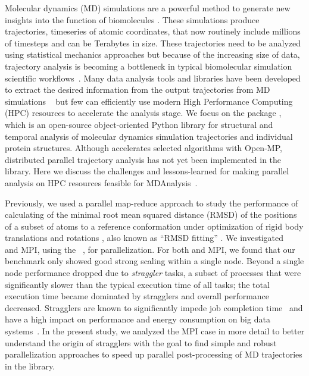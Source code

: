 \label{sec:introduction}
Molecular dynamics (MD) simulations are a powerful method to generate new insights into the function of biomolecules \citep{Borhani:2012mi, Dror:2012cr, Orozco:2014dq, Perilla:2015kx, Bottaro:2018aa}.
These simulations produce trajectories, timeseries of atomic coordinates, that now routinely include millions of timesteps and can be Terabytes in size.
These trajectories need to be analyzed using statistical mechanics approaches \cite{Mura:2014kx} but because of the increasing size of data, trajectory analysis is becoming a bottleneck in typical biomolecular simulation scientific workflows~\cite{Cheatham:2015}.
Many data analysis tools and libraries have been developed to extract the desired information from the output trajectories from MD simulations ~\cite{nmoldyn, nmoldyn-2012, Hum96, Hinsen:2000kx, Grant:2006ud, himach-2008, Romo:2009zr, Romo:2014bh, Michaud-Agrawal:2011fu, Gowers:2016aa, cpptraj-2013, mdtraj-2015, pteros2015, Doerr:2016aa} but few can efficiently use modern High Performance Computing (HPC) resources to accelerate the analysis stage.
We focus on the  package \citep{Gowers:2016aa,Michaud-Agrawal:2011fu}, which is an open-source object-oriented Python library for structural and temporal analysis of molecular dynamics simulation trajectories and individual protein structures.
Although  accelerates selected algorithms with Open-MP, distributed parallel trajectory analysis has not yet been implemented in the library.
Here we discuss the challenges and lessons-learned for making parallel analysis on HPC resources feasible for MDAnalysis~.

Previously, we used a parallel map-reduce approach to study the performance of calculating of the minimal root mean squared distance (RMSD) of the positions of a subset of atoms to a reference conformation under optimization of rigid body translations and rotations \cite{Khoshlessan:2017ab, ICCP-2018}, also known as ``RMSD fitting'' \cite{Liu:2010kx, Mura:2014kx}. 
We investigated ~\cite{Rocklin:2015aa} and MPI, using the ~\cite{Dalcin:2011aa, Dalcin:2005aa}, for parallelization. 
For both  and MPI, we found that our benchmark only showed good strong scaling within a single node.
Beyond a single node performance dropped due to \emph{straggler} tasks, a subset of processes that were significantly slower than the typical execution time of all tasks; the total execution time became dominated by stragglers and overall performance decreased.
Stragglers are known to significantly impede job completion time~\cite{Garraghan2016} and have a high impact on performance and energy consumption on big data systems~\cite{Tien-2017}.
In the present study, we analyzed the MPI case in more detail to better understand the origin of stragglers with the goal to find simple and robust parallelization approaches to speed up parallel post-processing of MD trajectories in the  library.


